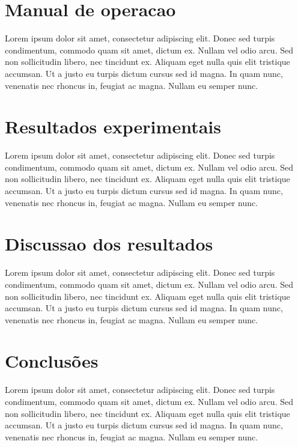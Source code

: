 \documentclass[12pt,twoside, a4paper, twocolumn]{article}
\begin{document}
\section{Manual de operacao}

Lorem ipsum dolor sit amet, consectetur adipiscing elit. Donec sed turpis condimentum, commodo quam sit amet, dictum ex. Nullam vel odio arcu. Sed non sollicitudin libero, nec tincidunt ex. Aliquam eget nulla quis elit tristique accumsan. Ut a justo eu turpis dictum cursus sed id magna. In quam nunc, venenatis nec rhoncus in, feugiat ac magna. Nullam eu semper nunc.

\section{Resultados experimentais}

Lorem ipsum dolor sit amet, consectetur adipiscing elit. Donec sed turpis condimentum, commodo quam sit amet, dictum ex. Nullam vel odio arcu. Sed non sollicitudin libero, nec tincidunt ex. Aliquam eget nulla quis elit tristique accumsan. Ut a justo eu turpis dictum cursus sed id magna. In quam nunc, venenatis nec rhoncus in, feugiat ac magna. Nullam eu semper nunc.

\section{Discussao dos resultados}

Lorem ipsum dolor sit amet, consectetur adipiscing elit. Donec sed turpis condimentum, commodo quam sit amet, dictum ex. Nullam vel odio arcu. Sed non sollicitudin libero, nec tincidunt ex. Aliquam eget nulla quis elit tristique accumsan. Ut a justo eu turpis dictum cursus sed id magna. In quam nunc, venenatis nec rhoncus in, feugiat ac magna. Nullam eu semper nunc.

\section{Conclusões}

Lorem ipsum dolor sit amet, consectetur adipiscing elit. Donec sed turpis condimentum, commodo quam sit amet, dictum ex. Nullam vel odio arcu. Sed non sollicitudin libero, nec tincidunt ex. Aliquam eget nulla quis elit tristique accumsan. Ut a justo eu turpis dictum cursus sed id magna. In quam nunc, venenatis nec rhoncus in, feugiat ac magna. Nullam eu semper nunc.
\end{document}
